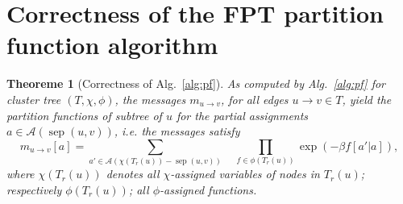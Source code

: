 \documentclass{bioinfo}
\newtheorem{theorem}{Theoreme}
\newcommand{\val}{a} %
\newcommand{\separator}[2]{\operatorname{sep}(#1,#2)}
\newcommand{\Message}[2]{m_{#1\rightarrow #2}}
\newcommand{\assignments}{\mathcal{A}}
\begin{document}
\section{Correctness of the FPT partition function algorithm}
\label{appsec:correctness}

\begin{theorem}[Correctness of Alg.~\ref{alg:pf}]
  \label{the:pfalgo-correctness}
  As computed by Alg.~\ref{alg:pf} for cluster tree $(T,\chi,\phi)$,
  the messages $\Message{u}{v}$, for all edges $u\to v\in T$, yield
  the partition functions of subtree of $u$ for the partial
  assignments $\val\in\assignments(\separator{u}{v})$, i.e. the
  messages satisfy
  \begin{equation}
   \Message{u}{v}[\val] = \sum_{\val'\in\assignments(\chi(T_r(u))-\separator{u}{v})} \quad
   \prod_{f\in\phi(T_r(u))} \exp(-\beta f[\val'|\val]),\label{eq:pfalgo-correct}
 \end{equation}
 where $\chi(T_r(u))$ denotes all $\chi$-assigned variables of nodes in $T_r(u)$;
 respectively $\phi(T_r(u))$; all $\phi$-assigned functions.
%
\end{theorem}
\end{document}
